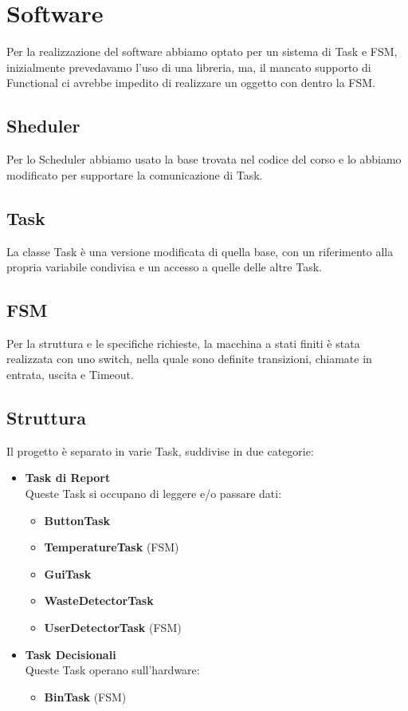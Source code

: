 \documentclass[a4paper,12pt]{report}
\begin{document}
\chapter{Software}
Per la realizzazione del software abbiamo optato per un sistema di Task e FSM,
inizialmente prevedavamo l'uso di una libreria, ma, il mancato supporto di Functional
ci avrebbe impedito di realizzare un oggetto con dentro la FSM.
\section{Sheduler}
Per lo Scheduler abbiamo usato la base trovata nel codice del corso e lo abbiamo 
modificato per supportare la comunicazione di Task.
\section{Task}
La classe Task è una versione modificata di quella base, con un riferimento alla propria 
variabile condivisa e un accesso a quelle delle altre Task.
\section{FSM}
Per la struttura e le specifiche richieste, la macchina a stati finiti
è stata realizzata con uno switch, nella quale sono definite transizioni, chiamate in entrata, uscita
e Timeout.
\newpage
\section{Struttura}
Il progetto è separato in varie Task, suddivise in due categorie:
\begin{itemize}
    \item \textbf{Task di Report} \\
    Queste Task si occupano di leggere e/o passare dati:
    \begin{itemize}
        \item \textbf{ButtonTask}
        \item \textbf{TemperatureTask} (FSM)
        \item \textbf{GuiTask}
        \item \textbf{WasteDetectorTask}
        \item \textbf{UserDetectorTask} (FSM)
    \end{itemize}
    
    \item \textbf{Task Decisionali} \\
    Queste Task operano sull'hardware:
    \begin{itemize}
        \item \textbf{BinTask} (FSM)
    \end{itemize}
\end{itemize}
\end{document}
